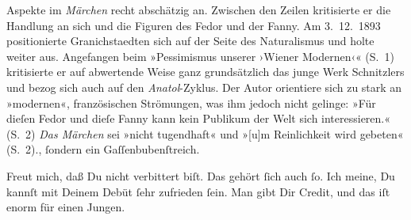 {{{                  Aspekte im \emph{Märchen} recht abschätzig an.
                  Zwischen den Zeilen kritisierte er die Handlung an sich und die Figuren des Fedor und der Fanny. Am 3. 12. 1893 positionierte Granichstaedten sich auf der Seite des Naturalismus und holte weiter aus.
                  Angefangen beim »Pessimismus unserer ›Wiener Modernen‹« (S. 1) kritisierte er auf
                  abwertende Weise ganz grundsätzlich das junge Werk Schnitzlers und bezog sich auch auf den \emph{Anatol}-Zyklus. Der Autor orientiere sich zu stark an »modernen«, französischen
                  Strömungen, was ihm jedoch nicht gelinge: »Für dieſen Fedor und dieſe Fanny kann kein Publikum der Welt
                     sich interessieren.« (S. 2) \emph{Das Märchen} sei »nicht tugendhaft« und
                     »[u]m Reinlichkeit wird gebeten« (S. 2).}}}\label{K_L02723-6},
               ſondern ein Gaſſenbubenſtreich.\pend
           
\pstart
           Freut mich, daß Du nicht {\pb}verbittert biſt. Das
               gehört ſich auch ſo. Ich meine, Du kannſt mit Deinem Debüt ſehr zufrieden ſein. Man gibt Dir
               Credit, und das iſt enorm für einen Jungen.\pend
           
